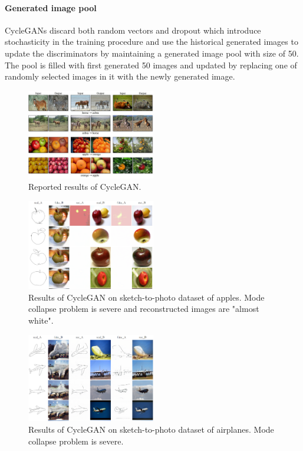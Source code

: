 \paragraph{Generated image pool}
CycleGANs discard both random vectors and dropout which introduce stochasticity in the training procedure and use the historical generated images to update the discriminators by maintaining a generated image pool with size of 50. The pool is filled with first generated 50 images and updated by replacing one of randomly selected images in it with the newly generated image.
%
\begin{figure}
	
	\includegraphics[width=0.5\textwidth]{figures/cyclegan/reported_results.jpg}
	\caption{\label{cyclegan_reported_results}Reported results of CycleGAN.}
\end{figure}
%
\begin{figure}
	
	\includegraphics[width=0.5\textwidth]{figures/cyclegan/sketch2photo_apple_200epochs_torch.png}
	\caption{\label{cyclegan_sketch2photo_apple}Results of CycleGAN on sketch-to-photo dataset of apples. Mode collapse problem is severe and reconstructed images are "almost white".}
\end{figure}
%
\begin{figure}
	
	\includegraphics[width=0.5\textwidth]{figures/cyclegan/sketch2photo_airplane_200epochs_torch.png}
	\caption{\label{cyclegan_sketch2photo_airplane}Results of CycleGAN on sketch-to-photo dataset of airplanes. Mode collapse problem is severe.}
\end{figure}
%
%
